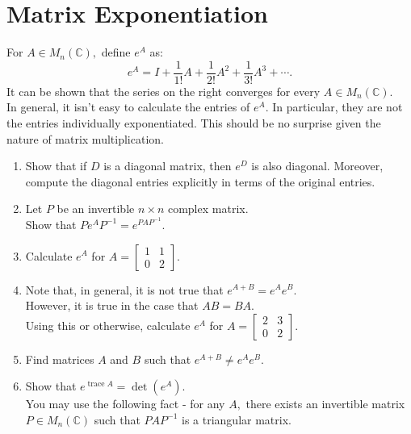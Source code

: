 \documentclass[12pt]{article}
\begin{document}
\section{Matrix Exponentiation}
	For $A \in M_n(\mathbb{C}),$ define $e^A$ as:
	\[e^A = I + \frac{1}{1!}A + \frac{1}{2!}A^2 + \frac{1}{3!}A^3 + \cdots.\]
	It can be shown that the series on the right converges for every $A \in M_n(\mathbb{C}).$\\
	In general, it isn't easy to calculate the entries of $e^A.$ In particular, they are not the entries individually exponentiated. This should be no surprise given the nature of matrix multiplication.
	\begin{enumerate} 
		\item Show that if $D$ is a diagonal matrix, then $e^D$ is also diagonal. Moreover, compute the diagonal entries explicitly in terms of the original entries.
		\item Let $P$ be an invertible $n \times n$ complex matrix.\\
		Show that $Pe^AP^{-1} = e^{PAP^{-1}}.$
		\item Calculate $e^A$ for $A = \begin{bmatrix}
			1 & 1\\
			0 & 2
		\end{bmatrix}.$
		\item Note that, in general, it is not true that $e^{A+B} = e^Ae^B.$\\
		However, it is true in the case that $AB = BA.$\\
		Using this or otherwise, calculate $e^A$ for $A = \begin{bmatrix}
			2 & 3\\
			0 & 2
		\end{bmatrix}.$
		\item Find matrices $A$ and $B$ such that $e^{A+B} \neq e^Ae^B.$
		\item Show that $e^{\operatorname{trace} A} = \det(e^A).$\\
		You may use the following fact - for any $A,$ there exists an invertible matrix $P \in M_n(\mathbb{C})$ such that $PAP^{-1}$ is a triangular matrix.
	\end{enumerate}
\end{document}
